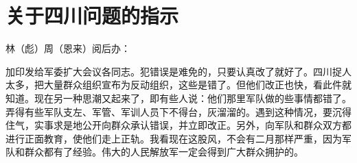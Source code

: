 \section[关于四川问题的指示（一九六七年四月二十三日）]{关于四川问题的指示}


林（彪）周（恩来）阅后办：

加印发给军委扩大会议各同志。犯错误是难免的，只要认真改了就好了。四川捉人太多，把大量群众组织宣布为反动组织，这些是错了。但他们改正也快，看此件就知道。现在另一种思潮又起来了，即有些人说：他们那里军队做的些事情都错了。弄得有些军队支左、军管、军训人员下不得台，灰溜溜的。遇到这种情况，要沉得住气，实事求是地公开向群众承认错误，并立即改正。另外，向军队和群众双方都进行正面教育，使他们走上正轨。我看现在这股风，不会有二月那样严重，因为军队和群众都有了经验。伟大的人民解放军一定会得到广大群众拥护的。


